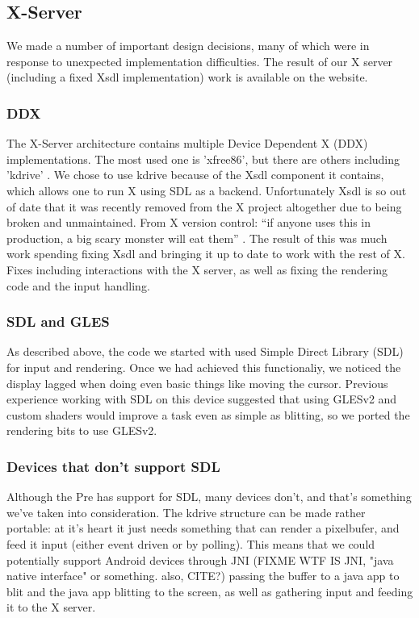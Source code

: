 \subsection{X-Server}

We made a number of important design decisions, many of which were in response to unexpected implementation difficulties.  The result of our X server (including a fixed Xsdl implementation) work is available on the website.
\subsubsection{DDX}
The X-Server architecture contains multiple Device Dependent X (DDX) implementations.  The most used one is 'xfree86', but there are others including 'kdrive' \cite{x_glossary}.  We chose to use kdrive because of the Xsdl component it contains, which allows one to run X using SDL as a backend.  Unfortunately Xsdl is so out of date that it was recently removed from the X project altogether due to being broken and unmaintained.
From X version control: ``if anyone uses this in production, a big scary monster will eat them'' \cite{x_quote}.  The result of this was much work spending fixing Xsdl and bringing it up to date to work with the rest of X.  Fixes including interactions with the X server, as well as fixing the rendering code and the input handling.
\subsubsection{SDL and GLES}
As described above, the code we started with used Simple Direct Library (SDL) \cite{sdl} for input and rendering.  Once we had achieved this functionaliy, we noticed the display lagged when doing even basic things like moving the cursor.  Previous experience working with SDL on this device suggested that using GLESv2 \cite{gles} and custom shaders would improve a task even as simple as blitting, so we ported the rendering bits to use GLESv2.

\subsubsection{Devices that don't support SDL}
Although the Pre has support for SDL, many devices don't, and that's something we've taken into consideration.  The kdrive structure can be made rather portable: at it's heart it just needs something that can render a pixelbufer, and feed it input (either event driven or by polling).  This means that we could potentially support Android devices through JNI (FIXME WTF IS JNI, "java native interface" or something. also, CITE?) passing the buffer to a java app to blit and the java app blitting to the screen, as well as gathering input and feeding it to the X server.
